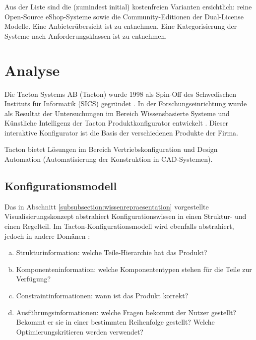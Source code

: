 \documentclass[12pt,a4paper,bibliography=totocnumbered,listof=totoc]{scrartcl}
\begin{document}
Aus der Liste sind die (zumindest initial) kostenfreien Varianten ersichtlich: reine Open-Source eShop-Systeme sowie die Community-Editionen der Dual-License Modelle. Eine Anbieterübersicht ist \citet{t3n14} zu entnehmen. Eine Kategorisierung der Systeme nach Anforderungsklassen ist \citet{graf14} zu entnehmen.

\pagebreak
\section{Analyse}

Die Tacton Systems AB (Tacton) wurde 1998 als Spin-Off des Schwedischen Instituts für Informatik (SICS) gegründet \citep{tactonProductOverview}. In der Forschungseinrichtung wurde als Resultat der Untersuchungen im Bereich Wissensbasierte Systeme und Künstliche Intelligenz der Tacton Produktkonfigurator entwickelt \citep{tactonAbout}. Dieser interaktive Konfigurator ist die Basis der verschiedenen Produkte der Firma.

Tacton bietet Lösungen im Bereich Vertriebskonfiguration und Design Automation (Automatisierung der Konstruktion in CAD-Systemen).

\subsection{Konfigurationsmodell}
\label{subsection:Konfigurationsmodell}
Das in Abschnitt \ref{subsubsection:wissenrepraesentation} vorgestellte Visualisierungskonzept abstrahiert Konfigurationswissen in einen Struktur- und einen Regelteil. Im Tacton-Konfigurationsmodell wird ebenfalls abstrahiert, jedoch in andere Domänen \citep{tactonModeling}:

\begin{enumerate}[a.]
\item \label{strukturinformation} Strukturinformation: welche Teile-Hierarchie hat das Produkt? 
\item \label{komponenteninformation} Komponenteninformation: welche  Komponententypen stehen für die Teile zur Verfügung?
\item \label{constraintinformationen} Constraintinformationen: wann ist das Produkt korrekt?
\item \label{ausfuehrungsinformationen} Ausführungsinformationen: welche Fragen bekommt der Nutzer gestellt? Bekommt er sie in einer bestimmten Reihenfolge gestellt? Welche Optimierungskritieren werden verwendet?
\end{enumerate}
\end{document}
